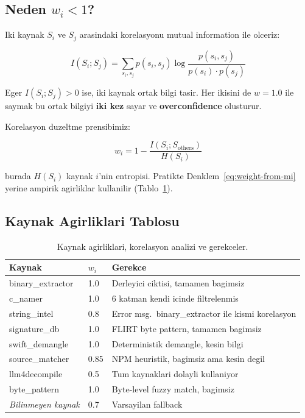 \subsection{Neden $w_i < 1$?}

Iki kaynak $S_i$ ve $S_j$ arasindaki korelasyonu mutual information ile olceriz:

\begin{equation}
I(S_i; S_j) = \sum_{s_i, s_j} p(s_i, s_j) \log\frac{p(s_i, s_j)}{p(s_i) \cdot p(s_j)}
\label{eq:mutual-info}
\end{equation}

Eger $I(S_i; S_j) > 0$ ise, iki kaynak ortak bilgi tasir. Her ikisini de $w=1.0$ ile saymak bu ortak bilgiyi \textbf{iki kez} sayar ve \textbf{overconfidence} olusturur.

Korelasyon duzeltme prensibimiz:

\begin{equation}
w_i = 1 - \frac{I(S_i; S_{\text{others}})}{H(S_i)}
\label{eq:weight-from-mi}
\end{equation}

burada $H(S_i)$ kaynak $i$'nin entropisi. Pratikte Denklem~\ref{eq:weight-from-mi} yerine ampirik agirliklar kullanilir (Tablo~\ref{tab:weights-detail}).

\subsection{Kaynak Agirliklari Tablosu}

\begin{table}[h]
\centering
\small
\begin{tabular}{llp{6.5cm}}
\toprule
\textbf{\color{sectioncyan}Kaynak} & \textbf{\color{sectioncyan}$w_i$} & \textbf{\color{sectioncyan}Gerekce} \\
\midrule
binary\_extractor & 1.0 & Derleyici ciktisi, tamamen bagimsiz \\
c\_namer & 1.0 & 6 katman kendi icinde filtrelenmis \\
string\_intel & 0.8 & Error msg.~binary\_extractor ile kismi korelasyon \\
signature\_db & 1.0 & FLIRT byte pattern, tamamen bagimsiz \\
swift\_demangle & 1.0 & Deterministik demangle, kesin bilgi \\
source\_matcher & 0.85 & NPM heuristik, bagimsiz ama kesin degil \\
llm4decompile & 0.5 & Tum kaynaklari dolayli kullaniyor \\
byte\_pattern & 1.0 & Byte-level fuzzy match, bagimsiz \\
\midrule
\textit{Bilinmeyen kaynak} & 0.7 & Varsayilan fallback \\
\bottomrule
\end{tabular}
\caption{Kaynak agirliklari, korelasyon analizi ve gerekceler.}
\label{tab:weights-detail}
\end{table}

